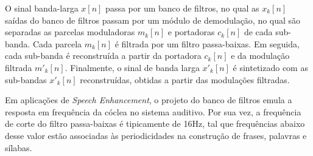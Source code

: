 O sinal banda-larga $x[n]$ passa por um banco de filtros, no
qual as  $x_k[n]$ saídas do banco de filtros passam por um módulo de
demodulação, no qual são separadas as parcelas moduladoras $m_k[n]$ e portadoras $c_k[n]$
de cada sub-banda. Cada parcela $m_k[n]$ é filtrada por um filtro passa-baixas.
Em seguida, cada sub-banda é reconstruída a partir da portadora $c_k[n]$ e da
modulação filtrada $m'_k[n]$. Finalmente, o sinal de banda larga $x'_k[n]$ é
sintetizado com as sub-bandas $x'_k[n]$ reconstruídas, obtidas a partir das
modulações filtradas.

Em aplicações de \textit{Speech Enhancement}, o projeto do banco de filtros
emula a resposta em frequência da cóclea no sistema auditivo. Por sua vez, a
frequência de corte do filtro passa-baixas é tipicamente de 16Hz, tal que
frequências abaixo desse valor estão associadas às periodicidades na construção
de frases, palavras e sílabas.